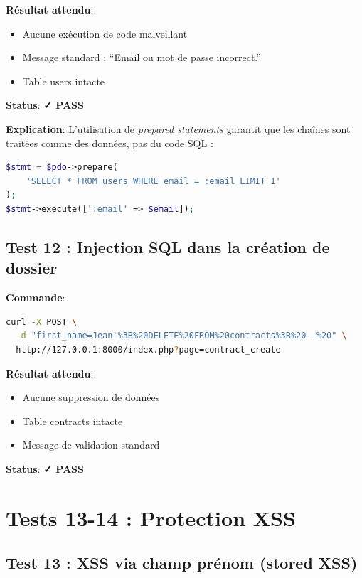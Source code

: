 \documentclass[11pt,a4paper,french]{report}
\newcommand{\pass}{\cellcolor{pass}\textbf{\color{white}✓ PASS}}
\begin{document}
\textbf{Résultat attendu}:
\begin{itemize}
    \item Aucune exécution de code malveillant
    \item Message standard : ``Email ou mot de passe incorrect.''
    \item Table users intacte
\end{itemize}

\textbf{Status}: \pass

\textbf{Explication}: L'utilisation de \textit{prepared statements} garantit que les chaînes 
sont traitées comme des données, pas du code SQL :

\begin{lstlisting}[language=PHP]
$stmt = $pdo->prepare(
    'SELECT * FROM users WHERE email = :email LIMIT 1'
);
$stmt->execute([':email' => $email]);
\end{lstlisting}

\subsection{Test 12 : Injection SQL dans la création de dossier}

\textbf{Commande}:
\begin{lstlisting}[language=bash]
curl -X POST \
  -d "first_name=Jean'%3B%20DELETE%20FROM%20contracts%3B%20--%20" \
  http://127.0.0.1:8000/index.php?page=contract_create
\end{lstlisting}

\textbf{Résultat attendu}:
\begin{itemize}
    \item Aucune suppression de données
    \item Table contracts intacte
    \item Message de validation standard
\end{itemize}

\textbf{Status}: \pass

\newpage

\section{Tests 13-14 : Protection XSS}

\subsection{Test 13 : XSS via champ prénom (stored XSS)}
\end{document}
